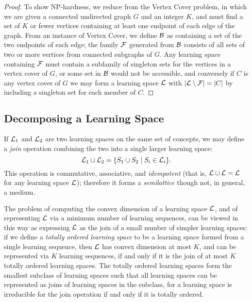\documentclass[11pt]{llncs}
\begin{document}
{\begin{proof}
To show NP-hardness, we reduce from the Vertex Cover problem, in which we are given a connected undirected graph $G$ and an integer $K$, and must find a set of $K$ or fewer vertices containing at least one endpoint of each edge of the graph. From an instance of Vertex Cover, we define $\cal B$ as containing a set of the two endpoints of each edge; the family $\cal F$ generated from $\cal B$ consists of all sets of two or more vertices from connected subgraphs of $G$.
Any learning space containing $\cal F$ must contain a subfamily of singleton sets for the vertices in a vertex cover of $G$, or some set in $\cal B$ would not be accessible, and conversely if $C$ is any vertex cover of $G$ we may form a learning space $\cal L$ with $|{\cal L}\setminus{\cal F}|=|C|$ by including a singleton set for each member of $C$.
\end{proof}

\subsection{Decomposing a Learning Space}

If ${\cal L}_1$ and ${\cal L}_2$ are two learning spaces on the same set of concepts, we may define a \emph{join} operation
combining the two into a single larger learning space:
$${\cal L}_1\sqcup {\cal L}_2 = \{ S_1 \cup S_2 \mid S_i\in{\cal L}_i \}.$$
This operation is commutative, associative, and \emph{idempotent} (that is, ${\cal L}\sqcup{\cal L}={\cal L}$ for any learning space $\cal L$); therefore it forms a \emph{semilattice} though not, in general, a medium.

The problem of computing the convex dimension of a learning space ${\cal L}$, and of representing ${\cal L}$ via a minimum number of learning sequences, can be viewed in this way as expressing $\cal L$ as the join of a small number of simpler learning spaces: if we define a \emph{totally ordered learning space} to be a learning space formed from a single learning sequence, then ${\cal L}$ has convex dimension at most $K$, and can be represented via $K$ learning sequences, if and only if it is the join of at most $K$ totally ordered learning spaces. The totally ordered learning spaces form the smallest subclass of learning spaces such that all learning spaces can be represented as joins of learning spaces in the subclass, for a learning space is irreducible for the join operation if and only if it is totally ordered.

}
\end{document}

